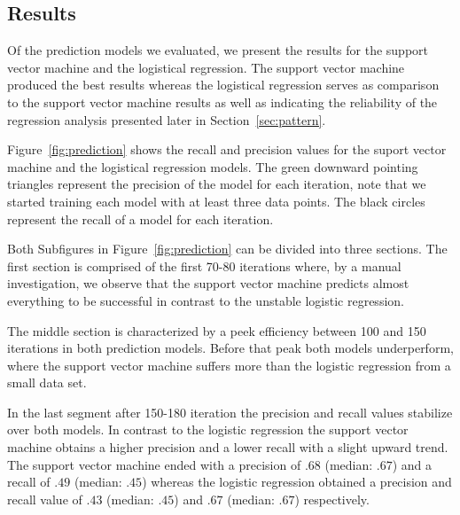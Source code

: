 


\subsection{Results}
Of the prediction models we evaluated, we present the results for the support
vector machine and the logistical regression. The support vector machine produced
the best results whereas the logistical regression serves as comparison to the
support vector machine results as well as indicating the reliability of
the regression analysis presented later in Section~\ref{sec:pattern}.

Figure~\ref{fig:prediction} shows the recall and precision values for the
suport vector machine and the logistical regression models. The green downward
pointing triangles represent the precision of the model for each iteration, note that we started training each model with at least three data points. The black circles represent the recall of a model for each
iteration.

Both Subfigures in Figure~\ref{fig:prediction} can be divided into three
sections. The first section is comprised of the first 70-80 iterations where,
by a manual investigation, we observe that the support vector machine predicts almost everything to be successful in contrast to the unstable logistic regression.

The middle section is characterized by a peek efficiency between 100 and 150
iterations in both prediction models. Before that peak both models underperform, where the support vector machine suffers more than the logistic regression from a small data set.

In the last segment after 150-180 iteration the precision and recall values
stabilize over both models. In contrast to the logistic regression the support vector machine obtains a higher precision and a lower recall with a slight upward trend.
The support vector machine ended with a precision of $.68$ (median: $.67$) and a recall of $.49$ (median: $.45$) whereas the logistic regression obtained a precision and recall value of $.43$ (median: $.45$) and $.67$ (median: $.67$) respectively.












